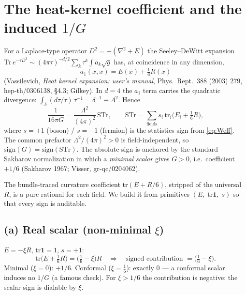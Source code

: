 \documentclass[11pt]{article}
\newcommand{\Tr}{\mathrm{Tr}}
\newcommand{\STr}{\mathrm{STr}}
\newcommand{\tr}{\mathrm{tr}}
\begin{document}
\section{The heat-kernel coefficient and the induced $1/G$}\label{sec:a1}

For a Laplace-type operator $D^2=-(\nabla^2+E)$ the Seeley--DeWitt expansion
$\Tr\,e^{-\tau D^2}\sim(4\pi\tau)^{-d/2}\sum_k\tau^k\!\int\! a_k\sqrt{g}$ has, at
coincidence in any dimension,
\begin{equation}\label{eq:a1}
a_1(x,x)=E(x)+\tfrac16 R(x)
\end{equation}
(Vassilevich, \emph{Heat kernel expansion: user's manual}, Phys.\ Rept.\ 388 (2003) 279,
hep-th/0306138, \S4.3; Gilkey). In $d=4$ the $a_1$ term carries the quadratic
divergence: $\int_\delta(d\tau/\tau)\,\tau^{-1}=\delta^{-1}\equiv\Lambda^2$. Hence
\begin{equation}\label{eq:induced}
\frac{1}{16\pi G}=\frac{\Lambda^2}{(4\pi)^2}\,\STr,
\qquad
\STr=\sum_{\text{fields}} s_i\,\tr_i\!\big(E_i+\tfrac16 R\big),
\end{equation}
where $s=+1$ (boson) / $s=-1$ (fermion) is the statistics sign from \eqref{eq:Weff}.
The common prefactor $\Lambda^2/(4\pi)^2>0$ is field-independent, so
$\mathrm{sign}(G)=\mathrm{sign}(\STr)$. The absolute sign is anchored by the standard
Sakharov normalization in which a \emph{minimal scalar} gives $G>0$, i.e.\ coefficient
$+1/6$ (Sakharov 1967; Visser, gr-qc/0204062).

The bundle-traced curvature coefficient $\tr(E+R/6)$, stripped of the universal $R$, is
a pure rational for each field. We build it from primitives $(E,\;\tr\mathbf{1},\;s)$ so
that every sign is auditable.

\subsection*{(a) Real scalar (non-minimal $\xi$)}
$E=-\xi R$, $\tr\mathbf{1}=1$, $s=+1$:
\begin{equation}\label{eq:scalar}
\tr\!\big(E+\tfrac16 R\big)=\big(\tfrac16-\xi\big)R
\quad\Longrightarrow\quad
\text{signed contribution }=\big(\tfrac16-\xi\big).
\end{equation}
Minimal ($\xi=0$): $+1/6$. Conformal ($\xi=\tfrac16$): exactly $0$ --- a conformal
scalar induces no $1/G$ (a famous check). For $\xi>1/6$ the contribution is negative:
the scalar sign is dialable by $\xi$.
\end{document}
